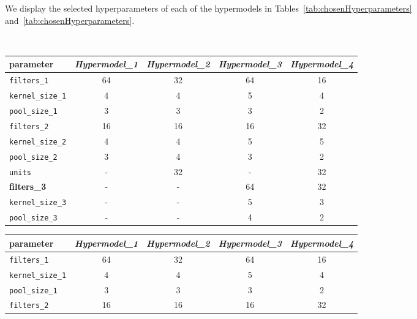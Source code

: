 We display the selected hyperparameters of each of the hypermodels in Tables~\ref{tab:chosenHyperparameters} and~\ref{tab:chosenHyperparameters}.

\begin{table}
    \begin{subtable}{\textwidth}\
        \centering
        \begin{tabular}{lcccc}
            \small\textbf{parameter} & \textit{Hypermodel\_1} & \textit{Hypermodel\_2} & \textit{Hypermodel\_3} & \textit{Hypermodel\_4} \\
            \midrule
            \texttt{filters\_1} & 64 & 32 & 64 & 16 \\
            \texttt{kernel\_size\_1} & 4 & 4 & 5 & 4 \\
            \texttt{pool\_size\_1} & 3 & 3 & 3 & 2 \\
            \texttt{filters\_2} & 16 & 16 & 16 & 32 \\
            \texttt{kernel\_size\_2} & 4 & 4 & 5 & 5 \\
            \texttt{pool\_size\_2} & 3 & 4 & 3 & 2 \\
            \texttt{units} & - & 32 & - & 32 \\
            \textbf{filters\_3} & - & - & 64 & 32 \\
            \texttt{kernel\_size\_3} & - & - & 5 & 3 \\
            \texttt{pool\_size\_3} & - & - & 4 & 2 \\
        \end{tabular}
        \label{tab:chosenHyperparameters_tuners}
    \end{subtable}
    \bigbreak
    \bigbreak
    \begin{subtable}{\textwidth}
        \centering
        \begin{tabular}{lcccc}
            \small\textbf{parameter} & \textit{Hypermodel\_1} & \textit{Hypermodel\_2} & \textit{Hypermodel\_3} & \textit{Hypermodel\_4} \\
            \midrule
            \texttt{filters\_1} & 64 & 32 & 64 & 16 \\
            \texttt{kernel\_size\_1} & 4 & 4 & 5 & 4 \\
            \texttt{pool\_size\_1} & 3 & 3 & 3 & 2 \\
            \texttt{filters\_2} & 16 & 16 & 16 & 32 \\

\end{tabular}
\end{subtable}
\end{table}
